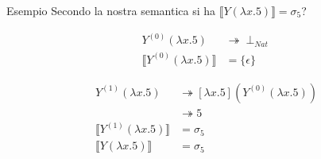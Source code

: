\documentclass{beamer}
\begin{document}
\begin{frame}

\begin{block}{Esempio}
	Secondo la nostra semantica si ha $\llbracket Y (\lambda x. 5) \rrbracket = \sigma_5$?
	
	\begin{align*}
		Y^{(0)}(\lambda x .5) & \twoheadrightarrow \perp_{Nat} \\
		\llbracket Y^{(0)}(\lambda x.5) \rrbracket & = \{ \epsilon \}
	\end{align*}
	
	\begin{align*}
		Y^{(1)}(\lambda x .5) & \twoheadrightarrow [\lambda x .5](Y^{(0)}(\lambda x .5)) \\
													& \twoheadrightarrow 5 \\
		\llbracket Y^{(1)}(\lambda x.5) \rrbracket & = \sigma_5 \\
		\llbracket Y(\lambda x.5) \rrbracket & = \sigma_5
	\end{align*}
	
	
\end{block}

\end{frame}
\end{document}
